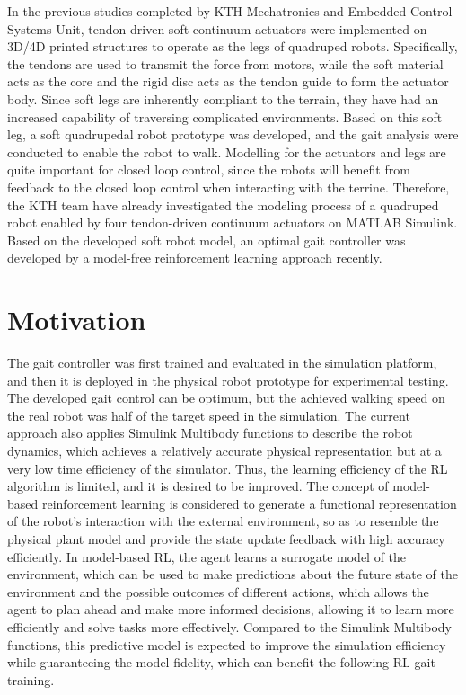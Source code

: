 In the previous studies\cite{thorapallimuralidharanContinuumActuatorBased2020} completed by KTH Mechatronics and Embedded Control Systems Unit, tendon-driven soft continuum actuators were implemented on 3D/4D printed structures to operate as the legs of quadruped robots. Specifically, the tendons are used to transmit the force from motors, while the soft material acts as the core and the rigid disc acts as the tendon guide to form the actuator body. Since soft legs are inherently compliant to the terrain, they have had an increased capability of traversing complicated environments. Based on this soft leg, a soft quadrupedal robot prototype was developed, and the gait analysis were conducted to enable the robot to walk\cite{daneliaStructureGaitOptimizationof2021}. Modelling for the actuators and legs are quite important for closed loop control, since the robots will benefit from feedback to the closed loop control when interacting with the terrine. Therefore, the KTH team\cite{muralidharanSoftQuadrupedRobot2021} have already investigated the modeling process of a quadruped robot enabled by four tendon-driven continuum actuators on MATLAB Simulink. Based on the developed soft robot model, an optimal gait controller was developed by a model-free reinforcement learning approach\cite{jiSynthesizingOptimalGait2022} recently.
\section{Motivation}
 The gait controller was first trained and evaluated in the simulation platform, and then it is deployed in the physical robot prototype for experimental testing. The developed gait control can be optimum, but the achieved walking speed on the real robot was half of the target speed in the simulation\cite{jiSynthesizingOptimalGait2022}. The current approach also applies Simulink Multibody functions to describe the robot dynamics, which achieves a relatively accurate physical representation but at a very low time efficiency of the simulator. Thus, the learning efficiency of the \ac{RL} algorithm is limited, and it is desired to be improved. The concept of model-based reinforcement learning is considered to generate a functional representation of the robot’s interaction with the external environment, so as to resemble the physical plant model and provide the state update feedback with high accuracy efficiently\cite{rayModelBasedReinforcementLearning2010}. In model-based \ac{RL}, the agent learns a surrogate model of the environment, which can be used to make predictions about the future state of the environment and the possible outcomes of different actions, which allows the agent to plan ahead and make more informed decisions, allowing it to learn more efficiently and solve tasks more effectively\cite{polydorosSurveyModelBasedReinforcement2017}. Compared to the Simulink Multibody functions, this predictive model is expected to improve the simulation efficiency while guaranteeing the model fidelity, which can benefit the following \ac{RL} gait training. 
 
